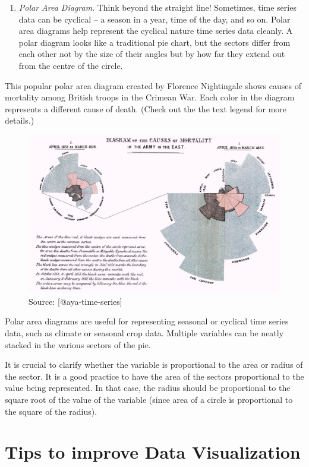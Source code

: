 \documentclass[]{book}
\providecommand{\tightlist}{%
  \setlength{\itemsep}{0pt}\setlength{\parskip}{0pt}}
\theoremstyle{definition}
\theoremstyle{definition}
\theoremstyle{definition}
\theoremstyle{remark}
\begin{document}
\begin{enumerate}
\def\labelenumi{\arabic{enumi}.}
\setcounter{enumi}{6}
\tightlist
\item
  \emph{Polar Area Diagram}. Think beyond the straight line! Sometimes,
  time series data can be cyclical -- a season in a year, time of the
  day, and so on. Polar area diagrams help represent the cyclical nature
  time series data cleanly. A polar diagram looks like a traditional pie
  chart, but the sectors differ from each other not by the size of their
  angles but by how far they extend out from the centre of the circle.
\end{enumerate}

This popular polar area diagram created by Florence Nightingale shows
causes of mortality among British troops in the Crimean War. Each color
in the diagram represents a different cause of death. (Check out the the
text legend for more details.)

\begin{figure}

{\centering \includegraphics[width=0.5\linewidth]{images/aya-polar} 

}

\caption{Source: [@aya-time-series]}\label{fig:aya-polar}
\end{figure}

Polar area diagrams are useful for representing seasonal or cyclical
time series data, such as climate or seasonal crop data. Multiple
variables can be neatly stacked in the various sectors of the pie.

It is crucial to clarify whether the variable is proportional to the
area or radius of the sector. It is a good practice to have the area of
the sectors proportional to the value being represented. In that case,
the radius should be proportional to the square root of the value of the
variable (since area of a circle is proportional to the square of the
radius).

\section{Tips to improve Data
Visualization}\label{tips-to-improve-data-visualization}
\end{document}
